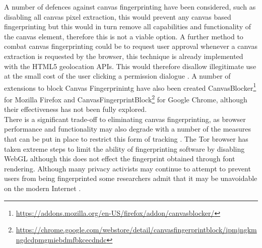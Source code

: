\documentclass[12pt]{article}
\begin{document}
A number of defences against canvas fingerprinting have been considered, such as disabling all canvas pixel extraction, this would prevent any canvas based fingerprinting but this would in turn remove all capabilities and functionality of the canvas element, therefore this is not a viable option. A further method to combat canvas fingerprinting could be to request user approval whenever a canvas extraction is requested by the browser, this technique is already implemented with the HTML5 geolocation APIs. This would therefore disallow illegitimate use at the small cost of the user clicking a permission dialogue \parencite{canvasFP}. A number of extensions to block Canvas Fingerprinintg have also been created CanvasBlocker\footnote{\url{ https://addons.mozilla.org/en-US/firefox/addon/canvasblocker/}} for Mozilla Firefox and CanvasFingerprintBlock\footnote{\url{ https://chrome.google.com/webstore/detail/canvasfingerprintblock/ipmjngkmngdcdpmgmiebdmfbkcecdndc}} for Google Chrome, although their effectiveness has not been fully explored. \\  

There is a significant trade-off to eliminating canvas fingerprinting, as browser performance and functionality may also degrade with a number of the measures that can be put in place to restrict this form of tracking \parencite{canvasFP}. The Tor browser has taken extreme steps to limit the ability of fingerprinting software by disabling WebGL although this does not effect the fingerprint obtained through font rendering. Although many privacy activists may continue to attempt to prevent users from being fingerprinted some researchers admit that it may be unavoidable on the modern Internet \parencite{canvasFP}.

\end{document}

